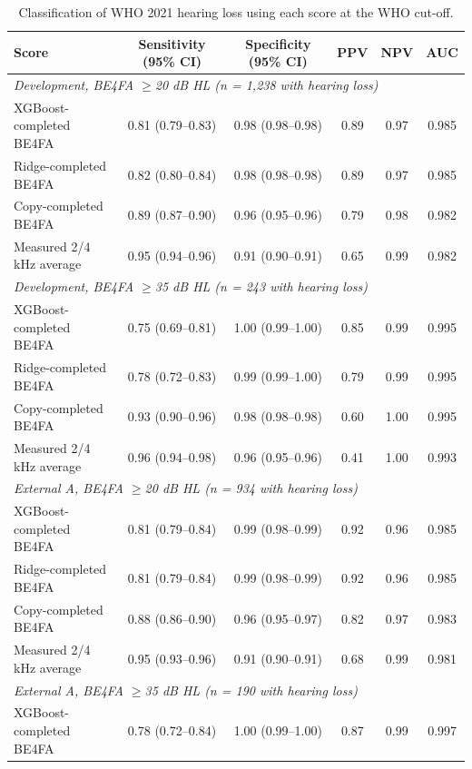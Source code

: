 \begin{table}[p]
\centering
\caption{Classification of WHO 2021 hearing loss using each score at the WHO cut-off.}
\label{tab:triage}
\small
\begin{tabular}{l ccccc}
\toprule
Score & Sensitivity (95\% CI) & Specificity (95\% CI) & PPV & NPV & AUC \\
\midrule
\multicolumn{6}{l}{\textit{Development, BE4FA $\geq$20 dB HL (n = 1,238 with hearing loss)}} \\
\quad XGBoost-completed BE4FA & 0.81 (0.79--0.83) & 0.98 (0.98--0.98) & 0.89 & 0.97 & 0.985 \\
\quad Ridge-completed BE4FA & 0.82 (0.80--0.84) & 0.98 (0.98--0.98) & 0.89 & 0.97 & 0.985 \\
\quad Copy-completed BE4FA & 0.89 (0.87--0.90) & 0.96 (0.95--0.96) & 0.79 & 0.98 & 0.982 \\
\quad Measured 2/4 kHz average & 0.95 (0.94--0.96) & 0.91 (0.90--0.91) & 0.65 & 0.99 & 0.982 \\
\multicolumn{6}{l}{\textit{Development, BE4FA $\geq$35 dB HL (n = 243 with hearing loss)}} \\
\quad XGBoost-completed BE4FA & 0.75 (0.69--0.81) & 1.00 (0.99--1.00) & 0.85 & 0.99 & 0.995 \\
\quad Ridge-completed BE4FA & 0.78 (0.72--0.83) & 0.99 (0.99--1.00) & 0.79 & 0.99 & 0.995 \\
\quad Copy-completed BE4FA & 0.93 (0.90--0.96) & 0.98 (0.98--0.98) & 0.60 & 1.00 & 0.995 \\
\quad Measured 2/4 kHz average & 0.96 (0.94--0.98) & 0.96 (0.95--0.96) & 0.41 & 1.00 & 0.993 \\
\multicolumn{6}{l}{\textit{External A, BE4FA $\geq$20 dB HL (n = 934 with hearing loss)}} \\
\quad XGBoost-completed BE4FA & 0.81 (0.79--0.84) & 0.99 (0.98--0.99) & 0.92 & 0.96 & 0.985 \\
\quad Ridge-completed BE4FA & 0.81 (0.79--0.84) & 0.99 (0.98--0.99) & 0.92 & 0.96 & 0.985 \\
\quad Copy-completed BE4FA & 0.88 (0.86--0.90) & 0.96 (0.95--0.97) & 0.82 & 0.97 & 0.983 \\
\quad Measured 2/4 kHz average & 0.95 (0.93--0.96) & 0.91 (0.90--0.91) & 0.68 & 0.99 & 0.981 \\
\multicolumn{6}{l}{\textit{External A, BE4FA $\geq$35 dB HL (n = 190 with hearing loss)}} \\
\quad XGBoost-completed BE4FA & 0.78 (0.72--0.84) & 1.00 (0.99--1.00) & 0.87 & 0.99 & 0.997 \\

\end{tabular}
\end{table}
